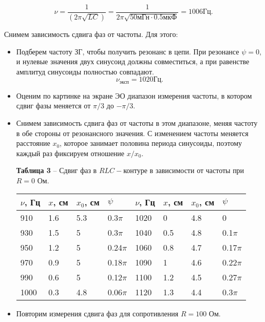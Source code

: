 \documentclass[12pt,a4paper]{article}
\begin{document}
        \[
        \nu = \frac{1}{(2 \pi \sqrt{LC})} = \frac{1}{2 \pi \sqrt{50\text{мГн} \cdot 0.5 \text{мкФ}}} = 1006 \text{Гц}.
        \]
        
        Снимем зависимость сдвига фаз от частоты. Для этого:
        \begin{itemize}
            \item Подберем частоту ЗГ, чтобы получить резонанс в цепи. При резонансе $\psi = 0$, и нулевые значения двух синусоид должны совместиться, а при равенстве амплитуд синусоиды полностью совпадают.
            \[
            \nu_{\text{эксп}} = 1020 \text{Гц}.
            \]
            \item Оценим по картинке на экране ЭО диапазон измерения частоты, в котором сдвиг фазы меняется от $\pi/3$ до $-\pi/3$.
            \item Снимем зависимость сдвига фаз от частоты в этом диапазоне, меняя частоту в обе стороны от резонансного значения. С изменением частоты меняется расстояние $x_0$, которое занимает половина периода синусоиды, поэтому каждый раз фиксируем отношение $x/x_0$.
            
            \begin{table}[!h]
            \begin{flushleft}
           		\hspace{20}\textbf{Таблица 3} -- Сдвиг фаз в $RLC-$контуре в зависимости от частоты при $R = 0$ Ом.\\
            \end{flushleft}
                \begin{center}
                    \begin{tabular}{ | l | l | l | l | l | l | l | l |}
                        \hline
                        $\nu$, Гц   &   $x$, см &  $x_0$, см&   $\psi$  &   $\nu$, Гц   &   $x$, см &  $x_0$, см&   $\psi$  \\
                        \hline
                        910     &   1.6 &   5.3 &   0.3$\pi$    &   1020    &   0   &   4.8 &   0           \\
                        930     &   1.5 &   5   &   0.3$\pi$    &   1040    &   0.5 &   4.8 &   0.1$\pi$    \\
                        950     &   1.2 &   5   &   0.24$\pi$   &   1060    &   0.8 &   4.7 &   0.17$\pi$   \\
                        970     &   0.9 &   5   &   0.18$\pi$   &   1090    &   1   &   4.6 &   0.22$\pi$   \\
                        990     &   0.6 &   5   &   0.12$\pi$   &   1100    &   1.2 &   4.5 &   0.27$\pi$   \\
                        1000    &   0.3 &   4.8 &   0.06$\pi$   &   1120    &   1.3 &   4.4 &   0.3$\pi$    \\
                        \hline         
                    \end{tabular}
                \end{center}
            \end{table}   
            \item Повторим измерения сдвига фаз для сопротивления $R = 100$ Ом.
            

\end{itemize}
\end{document}

